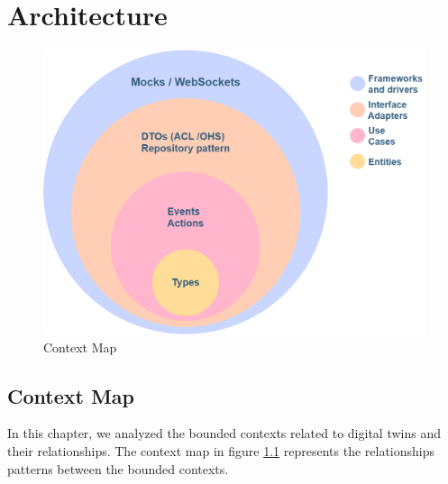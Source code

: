 \chapter{Architecture}

\begin{figure}[H]
    \centering
    \includegraphics[width=\textwidth]{img/clean-architecture.png}
    \caption{Context Map}
    \label{img:context-map}
\end{figure}

\section{Context Map}
In this chapter, we analyzed the bounded contexts related to digital twins and their relationships.
The context map in figure \ref{img:context-map} represents the relationships patterns between the bounded contexts.

